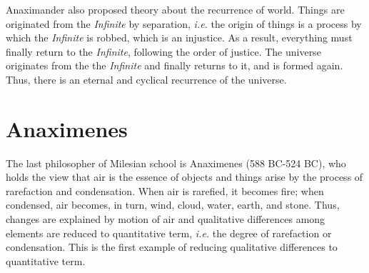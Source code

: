\documentclass[11pt]{article}
\begin{document}
\begin{sloppypar}
\par

Anaximander also proposed theory about the recurrence of world. 
Things are originated from the \textit{Infinite} by separation, \textit{i.e.} the origin of things is a process by which the \textit{Infinite} is robbed, which is an injustice. 
As a result, everything must finally return to the \textit{Infinite}, following the order of justice. 
The universe originates from the the \textit{Infinite} and finally returns to it, and is formed again. 
Thus, there is an eternal and cyclical recurrence of the universe.
  
\section{Anaximenes}
The last philosopher of Milesian school is Anaximenes (588 BC-524 BC), who holds the view that air is the essence of objects and things arise by the process of rarefaction and condensation. 
When air is rarefied, it becomes fire; when condensed, air becomes, in turn, wind, cloud, water, earth, and stone. 
Thus, changes are explained by motion of air and qualitative differences among elements are reduced to quantitative term, \textit{i.e.} the degree of rarefaction or condensation. 
This is the first example of reducing qualitative differences to quantitative term. 
\end{sloppypar}
\end{document}
